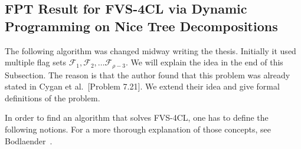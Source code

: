 \subsection{FPT Result for FVS-4CL via Dynamic Programming on Nice Tree Decompositions}
\label{alg:dp}

The following algorithm was changed midway writing the thesis. Initially it used multiple flag 
sets $\mathcal{F}_1, \mathcal{F}_2, \dots \mathcal{F}_{\rho-3}$. We will explain the idea in the 
end of this Subsection. The reason is that the author found that this problem was already stated 
in Cygan et al.~\cite{cygan2015parameterized}[Problem 7.21]. We extend their idea 
and give formal definitions of the problem.

In order to find an algorithm that solves FVS-4CL, one has to define the following notions. 
For a more thorough explanation of those concepts, see Bodlaender~\cite[Section 4.]{bodlaender1997treewidth}.

